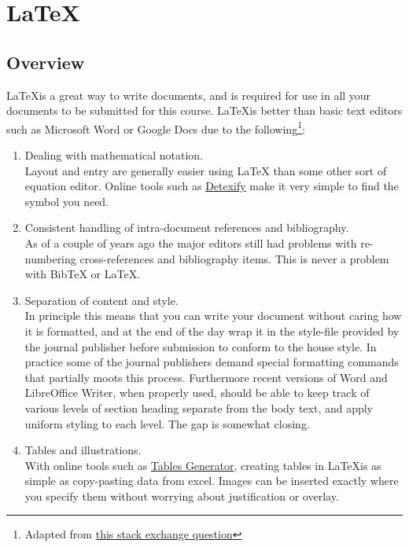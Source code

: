 \section{\LaTeX}
\subsection{Overview}
\LaTeX is a great way to write documents, and is required for use in all your documents to be submitted for this course. \LaTeX is better than basic text editors such as Microsoft Word or Google Docs due to the following\footnote{Adapted from \href{https://academia.stackexchange.com/questions/5414/what-are-the-advantages-or-disadvantages-of-using-latex-for-writing-scientific-p}{this stack exchange question}}:
\begin{enumerate}
    \item Dealing with mathematical notation.\\
    Layout and entry are generally easier using LaTeX than some other sort of equation editor. Online tools such as \href{http://detexify.kirelabs.org/classify.html}{Detexify} make it very simple to find the symbol you need.
    \item Consistent handling of intra-document references and bibliography.\\
    As of a couple of years ago the major editors still had problems with re-numbering cross-references and bibliography items. This is never a problem with BibTeX or LaTeX.
    \item Separation of content and style.\\
    In principle this means that you can write your document without caring how it is formatted, and at the end of the day wrap it in the style-file provided by the journal publisher before submission to conform to the house style. In practice some of the journal publishers demand special formatting commands that partially moots this process. Furthermore recent versions of Word and LibreOffice Writer, when properly used, should be able to keep track of various levels of section heading separate from the body text, and apply uniform styling to each level. The gap is somewhat closing.
    \item Tables and illustrations.\\
    With online tools such as \href{https://www.tablesgenerator.com/}{Tables Generator}, creating tables in \LaTeX is as simple as copy-pasting data from excel. Images can be inserted exactly where you specify them without worrying about justification or overlay.
\end{enumerate}

